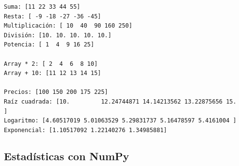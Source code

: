 \documentclass[
  doc,
  floatsintext,
  longtable,
  a4paper,
  nolmodern,
  notxfonts,
  notimes,
  12pt,
  colorlinks=true,linkcolor=blue,citecolor=blue,urlcolor=blue]{apa7}
\begin{document}
\begin{verbatim}
Suma: [11 22 33 44 55]
Resta: [ -9 -18 -27 -36 -45]
Multiplicación: [ 10  40  90 160 250]
División: [10. 10. 10. 10. 10.]
Potencia: [ 1  4  9 16 25]

Array * 2: [ 2  4  6  8 10]
Array + 10: [11 12 13 14 15]

Precios: [100 150 200 175 225]
Raíz cuadrada: [10.         12.24744871 14.14213562 13.22875656 15.        ]
Logaritmo: [4.60517019 5.01063529 5.29831737 5.16478597 5.4161004 ]
Exponencial: [1.10517092 1.22140276 1.34985881]
\end{verbatim}

\subsection{Estadísticas con NumPy}\label{estaduxedsticas-con-numpy}
\end{document}

